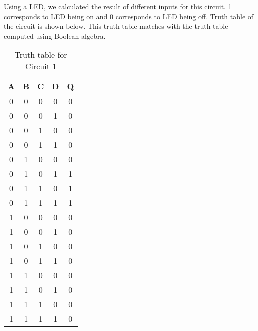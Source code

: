\documentclass[12pt]{article}
\begin{document}
Using a LED, we calculated the result of different inputs for this circuit. 1 corresponds to LED being on and 0 corresponds to LED being off. Truth table of the circuit is shown below.  This truth table matches with the truth table computed using Boolean algebra.
\begin{table}[H]
\begin{center}
\begin{tabular}{|c|c|c|c||c|}
	\hline
	\rule[-1ex]{0pt}{2.5ex} \textbf{A} & \textbf{B} & \textbf{C} & \textbf{D} & \textbf{Q} \\
	\hline \hline
	\rule[-1ex]{0pt}{2.5ex} 0 & 0 & 0 & 0 & 0 \\
	\hline
	\rule[-1ex]{0pt}{2.5ex} 0 & 0 & 0 & 1 & 0 \\
	\hline
	\rule[-1ex]{0pt}{2.5ex} 0 & 0 & 1 & 0 & 0 \\
	\hline
	\rule[-1ex]{0pt}{2.5ex} 0 & 0 & 1 & 1 & 0 \\
	\hline
	\rule[-1ex]{0pt}{2.5ex} 0 & 1 & 0 & 0 & 0 \\
	\hline
	\rule[-1ex]{0pt}{2.5ex} 0 & 1 & 0 & 1 & 1 \\
	\hline
	\rule[-1ex]{0pt}{2.5ex} 0 & 1 & 1 & 0 & 1 \\
	\hline
	\rule[-1ex]{0pt}{2.5ex} 0 & 1 & 1 & 1 & 1 \\
	\hline
	\rule[-1ex]{0pt}{2.5ex} 1 & 0 & 0 & 0 & 0 \\
	\hline
	\rule[-1ex]{0pt}{2.5ex} 1 & 0 & 0 & 1 & 0 \\
	\hline
	\rule[-1ex]{0pt}{2.5ex} 1 & 0 & 1 & 0 & 0 \\
	\hline
	\rule[-1ex]{0pt}{2.5ex} 1 & 0 & 1 & 1 & 0 \\
	\hline
	\rule[-1ex]{0pt}{2.5ex} 1 & 1 & 0 & 0 & 0 \\
	\hline
	\rule[-1ex]{0pt}{2.5ex} 1 & 1 & 0 & 1 & 0 \\
	\hline
	\rule[-1ex]{0pt}{2.5ex} 1 & 1 & 1 & 0 & 0 \\
	\hline
	\rule[-1ex]{0pt}{2.5ex} 1 & 1 & 1 & 1 & 0 \\
	\hline	
\end{tabular}
\caption{Truth table for Circuit 1}
\end{center}
\end{table}
\end{document}
